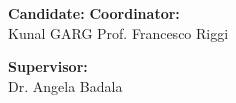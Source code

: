 \begin{titlepage}
\vspace{2.cm} 

\begin{normalsize}
\begin{flushleft}
\textbf{Candidate:}  \hspace{160pt} \textbf{Coordinator:} \\
Kunal GARG \hspace{4.0cm} Prof. Francesco Riggi \\
\end{flushleft}

\vspace{2pt}

\begin{flushleft}
\textbf{Supervisor:} \\
Dr. Angela Badala
\end{flushleft}
\end{normalsize}




\vspace{20pt}
\begin{center}
\end{center}

\end{titlepage}
